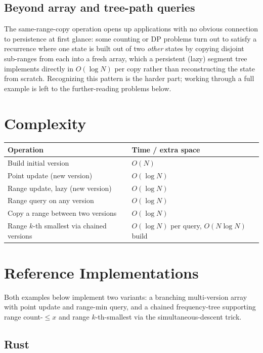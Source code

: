 \documentclass[11pt]{article}
\begin{document}
\subsection{Beyond array and tree-path queries}
The same-range-copy operation opens up applications with no obvious
connection to persistence at first glance: some counting or DP problems
turn out to satisfy a recurrence where one state is built out of two
\emph{other} states by copying disjoint sub-ranges from each into a fresh
array, which a persistent (lazy) segment tree implements directly in
$O(\log N)$ per copy rather than reconstructing the state from scratch.
Recognizing this pattern is the harder part; working through a full
example is left to the further-reading problems below.

\section{Complexity}
\begin{center}
\begin{tabular}{ll}
\toprule
\textbf{Operation} & \textbf{Time / extra space} \\
\midrule
Build initial version & $O(N)$ \\
Point update (new version) & $O(\log N)$ \\
Range update, lazy (new version) & $O(\log N)$ \\
Range query on any version & $O(\log N)$ \\
Copy a range between two versions & $O(\log N)$ \\
Range $k$-th smallest via chained versions & $O(\log N)$ per query, $O(N \log N)$ build \\
\bottomrule
\end{tabular}
\end{center}

\section{Reference Implementations}
Both examples below implement two variants: a branching multi-version
array with point update and range-min query, and a chained frequency-tree
supporting range count-$\le x$ and range $k$-th-smallest via the
simultaneous-descent trick.

\codenote
\subsection{Rust}
\end{document}
